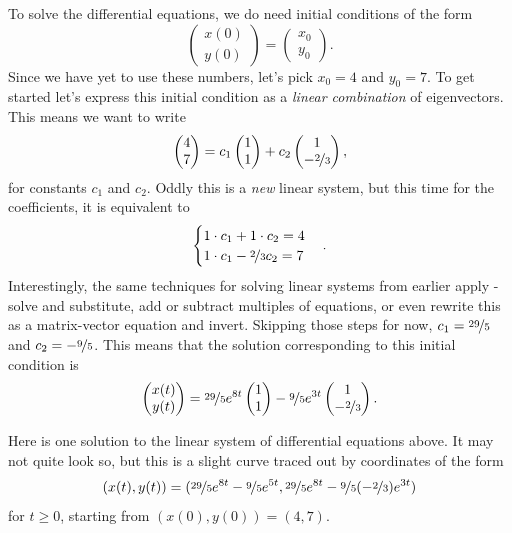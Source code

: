 \documentclass{article}
\begin{document}
To solve the differential equations, we do need initial conditions of the form \[\begin{pmatrix}x(0)\\y(0)\end{pmatrix} = \begin{pmatrix}x_0\\y_0\end{pmatrix}.\]  Since we have yet to use these numbers, let's pick \(x_0 = 4\) and \(y_0 = 7\).  To get started let's express this initial condition as a \emph{linear combination} of eigenvectors.  This means we want to write \[\begin{pmatrix}4\\7\end{pmatrix} = c_1\begin{pmatrix}1\\1\end{pmatrix} + c_2\begin{pmatrix}1\\-\nicefrac{2}{3}\end{pmatrix},\] for constants \(c_1\) and \(c_2\).  Oddly this is a \emph{new} linear system, but this time for the coefficients, it is equivalent to \[\begin{cases}1\cdot c_1 + 1\cdot c_2 = 4\\1\cdot c_1 -\nicefrac{2}{3}c_2 = 7\end{cases}.\] Interestingly, the same techniques for solving linear systems from earlier apply - solve and substitute, add or subtract multiples of equations, or even rewrite this as a matrix-vector equation and invert.  Skipping those steps for now, \(c_1 = \nicefrac{29}{5}\) and \(c_2 = -\nicefrac{9}{5}\).  This means that the solution corresponding to this initial condition is \[\begin{pmatrix}x(t)\\y(t)\end{pmatrix} = \nicefrac{29}{5}e^{8t}\begin{pmatrix}1\\1\end{pmatrix} - \nicefrac{9}{5}e^{3t}\begin{pmatrix}1\\-\nicefrac{2}{3}\end{pmatrix}.\]

Here is one solution to the linear system of differential equations above.  It may not quite look so, but this is a slight curve traced out by coordinates of the form \[(x(t), y(t)) = (\nicefrac{29}{5}e^{8t} - \nicefrac{9}{5}e^{5t}, \nicefrac{29}{5}e^{8t} -\nicefrac{9}{5}(-\nicefrac{2}{3})e^{3t})\] for \(t\geq 0\), starting from \((x(0), y(0)) = (4, 7)\).
\end{document}
